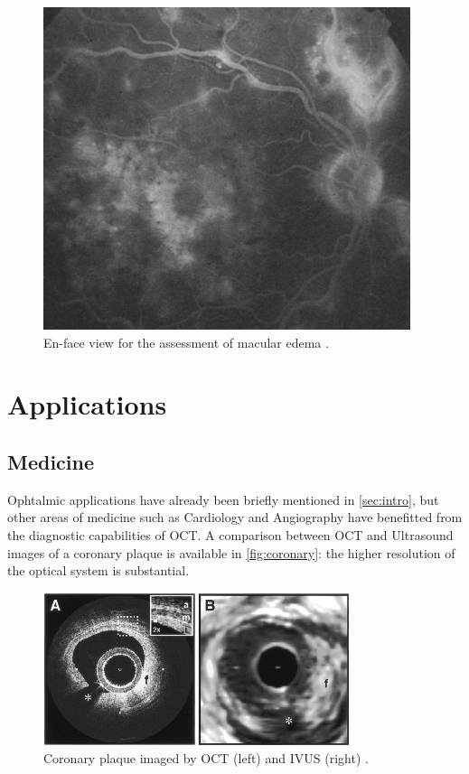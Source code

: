 \begin{figure}[hbt]
	\myfloatalign
		\includegraphics[width=0.45\linewidth]{gfx/ch1/en-face}
	\caption{En-face view for the assessment of macular edema \cite{MichaelRHee1995}.}\label{fig:en-face-example}
\end{figure}

\section{Applications}
\subsection{Medicine}
Ophtalmic applications have already been briefly mentioned in \autoref{sec:intro}, but other areas of medicine such as Cardiology \citep{Jang604,Bouma317} and Angiography \citep{Spaide2015,Jia2014} have benefitted from the diagnostic capabilities of OCT. A comparison between OCT and Ultrasound images of a coronary plaque is available in \autoref{fig:coronary}: the higher resolution of the optical system is substantial.



\begin{figure}[hbt]
	\myfloatalign
	\includegraphics[height=4.5cm]{gfx/ch1/oct-vs-ultrasound-endoscopy}
	\caption{Coronary plaque imaged by OCT (left) and  \acf{IVUS} (right) \citep{Jang604}.}\label{fig:coronary}
\end{figure}


